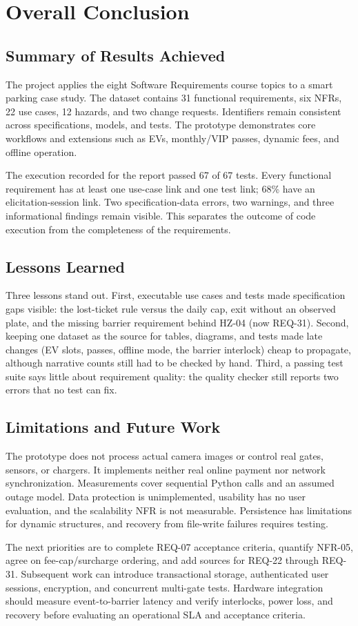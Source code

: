 \chapter*{Overall Conclusion}
\section*{Summary of Results Achieved}
The project applies the eight Software Requirements course topics to a smart parking case study. The dataset contains 31 functional requirements, six NFRs, 22 use cases, 12 hazards, and two change requests. Identifiers remain consistent across specifications, models, and tests. The prototype demonstrates core workflows and extensions such as EVs, monthly/VIP passes, dynamic fees, and offline operation.

The execution recorded for the report passed 67 of 67 tests. Every functional requirement has at least one use-case link and one test link; 68\% have an elicitation-session link. Two specification-data errors, two warnings, and three informational findings remain visible. This separates the outcome of code execution from the completeness of the requirements.

\section*{Lessons Learned}
Three lessons stand out. First, executable use cases and tests made specification gaps visible: the lost-ticket rule versus the daily cap, exit without an observed plate, and the missing barrier requirement behind HZ-04 (now REQ-31). Second, keeping one dataset as the source for tables, diagrams, and tests made late changes (EV slots, passes, offline mode, the barrier interlock) cheap to propagate, although narrative counts still had to be checked by hand. Third, a passing test suite says little about requirement quality: the quality checker still reports two errors that no test can fix.

\section*{Limitations and Future Work}
The prototype does not process actual camera images or control real gates, sensors, or chargers. It implements neither real online payment nor network synchronization. Measurements cover sequential Python calls and an assumed outage model. Data protection is unimplemented, usability has no user evaluation, and the scalability NFR is not measurable. Persistence has limitations for dynamic structures, and recovery from file-write failures requires testing.

The next priorities are to complete REQ-07 acceptance criteria, quantify NFR-05, agree on fee-cap/surcharge ordering, and add sources for REQ-22 through REQ-31. Subsequent work can introduce transactional storage, authenticated user sessions, encryption, and concurrent multi-gate tests. Hardware integration should measure event-to-barrier latency and verify interlocks, power loss, and recovery before evaluating an operational SLA and acceptance criteria.
